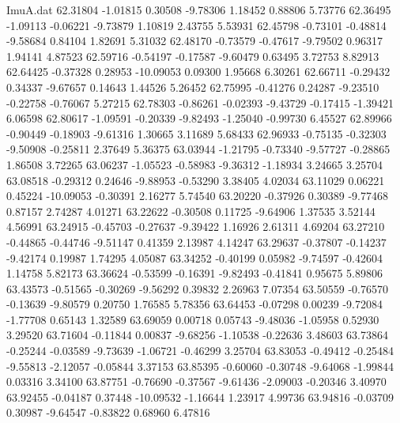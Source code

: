 \begin{filecontents}{ImuA.dat}
  62.31804   -1.01815    0.30508   -9.78306    1.18452    0.88806    5.73776
  62.36495   -1.09113   -0.06221   -9.73879    1.10819    2.43755    5.53931
  62.45798   -0.73101   -0.48814   -9.58684    0.84104    1.82691    5.31032
  62.48170   -0.73579   -0.47617   -9.79502    0.96317    1.94141    4.87523
  62.59716   -0.54197   -0.17587   -9.60479    0.63495    3.72753    8.82913
  62.64425   -0.37328    0.28953  -10.09053    0.09300    1.95668    6.30261
  62.66711   -0.29432    0.34337   -9.67657    0.14643    1.44526    5.26452
  62.75995   -0.41276    0.24287   -9.23510   -0.22758   -0.76067    5.27215
  62.78303   -0.86261   -0.02393   -9.43729   -0.17415   -1.39421    6.06598
  62.80617   -1.09591   -0.20339   -9.82493   -1.25040   -0.99730    6.45527
  62.89966   -0.90449   -0.18903   -9.61316    1.30665    3.11689    5.68433
  62.96933   -0.75135   -0.32303   -9.50908   -0.25811    2.37649    5.36375
  63.03944   -1.21795   -0.73340   -9.57727   -0.28865    1.86508    3.72265
  63.06237   -1.05523   -0.58983   -9.36312   -1.18934    3.24665    3.25704
  63.08518   -0.29312    0.24646   -9.88953   -0.53290    3.38405    4.02034
  63.11029    0.06221    0.45224  -10.09053   -0.30391    2.16277    5.74540
  63.20220   -0.37926    0.30389   -9.77468    0.87157    2.74287    4.01271
  63.22622   -0.30508    0.11725   -9.64906    1.37535    3.52144    4.56991
  63.24915   -0.45703   -0.27637   -9.39422    1.16926    2.61311    4.69204
  63.27210   -0.44865   -0.44746   -9.51147    0.41359    2.13987    4.14247
  63.29637   -0.37807   -0.14237   -9.42174    0.19987    1.74295    4.05087
  63.34252   -0.40199    0.05982   -9.74597   -0.42604    1.14758    5.82173
  63.36624   -0.53599   -0.16391   -9.82493   -0.41841    0.95675    5.89806
  63.43573   -0.51565   -0.30269   -9.56292    0.39832    2.26963    7.07354
  63.50559   -0.76570   -0.13639   -9.80579    0.20750    1.76585    5.78356
  63.64453   -0.07298    0.00239   -9.72084   -1.77708    0.65143    1.32589
  63.69059    0.00718    0.05743   -9.48036   -1.05958    0.52930    3.29520
  63.71604   -0.11844    0.00837   -9.68256   -1.10538   -0.22636    3.48603
  63.73864   -0.25244   -0.03589   -9.73639   -1.06721   -0.46299    3.25704
  63.83053   -0.49412   -0.25484   -9.55813   -2.12057   -0.05844    3.37153
  63.85395   -0.60060   -0.30748   -9.64068   -1.99844    0.03316    3.34100
  63.87751   -0.76690   -0.37567   -9.61436   -2.09003   -0.20346    3.40970
  63.92455   -0.04187    0.37448  -10.09532   -1.16644    1.23917    4.99736
  63.94816   -0.03709    0.30987   -9.64547   -0.83822    0.68960    6.47816

\end{filecontents}
